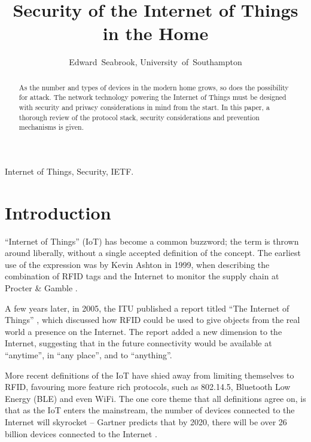 \documentclass[10pt,journal,compsoc]{IEEEtran}
\begin{document}
\title{Security of the Internet of Things in the Home}
\author{Edward~Seabrook, University~of~Southampton }

\maketitle


\begin{abstract}
As the number and types of devices in the modern home grows, so does the
possibility for attack. The network technology powering the Internet of Things
must be designed with security and privacy considerations in mind from the
start. In this paper, a thorough review of the protocol stack, security
considerations and prevention mechanisms is given. 
\end{abstract}

\begin{IEEEkeywords}
Internet of Things, Security, IETF.
\end{IEEEkeywords}

\IEEEpeerreviewmaketitle

\section{Introduction}
 ``Internet of Things'' (IoT) has become a common buzzword;
the term is thrown around liberally, without a single accepted definition
of the concept. The earliest use of the expression was by Kevin Ashton in 1999,
when describing the combination of RFID tags and the Internet to monitor the
supply chain at Procter \& Gamble \cite{Ashton2009}. 

A few years later, in 2005, the ITU published a report titled ``The Internet of
Things'' \cite{ITU_IoT}, which discussed how RFID could be used to give objects
from the real world a presence on the Internet. The report added a new
dimension to the Internet, suggesting that in the future connectivity would be
available at ``anytime'', in ``any place'', and to ``anything''.

More recent definitions of the IoT have shied away from limiting themselves to
RFID, favouring more feature rich protocols, such as 802.14.5, Bluetooth Low
Energy (BLE) and even WiFi. The one core theme that all definitions agree on,
is that as the IoT enters the mainstream, the number of devices connected to
the Internet will skyrocket -- Gartner predicts that by 2020, there will
be over 26 billion devices connected to the Internet \cite{Gartner2014}. 
\end{document}
